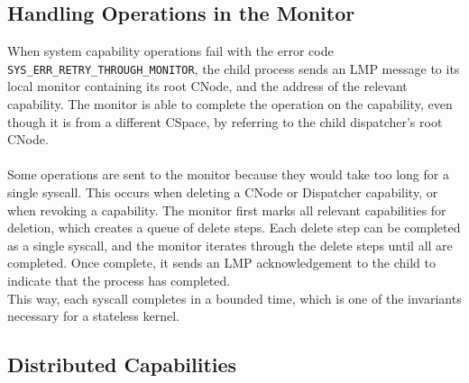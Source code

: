 \subsection{Handling Operations in the Monitor}
\noindent
When system capability operations fail with the error code \texttt{SYS\_ERR\_RETRY\_THROUGH\_MONITOR}, the child process sends an LMP message to its local monitor containing its root CNode, and the address of the relevant capability. The monitor is able to complete the operation on the capability, even though it is from a different CSpace, by referring to the child dispatcher's root CNode.
\\\\
Some operations are sent to the monitor because they would take too long for a single syscall. This occurs when deleting a CNode or Dispatcher capability, or when revoking a capability. The monitor first marks all relevant capabilities for deletion, which creates a queue of delete steps. Each delete step can be completed as a single syscall, and the monitor iterates through the delete steps until all are completed. Once complete, it sends an LMP acknowledgement to the child to indicate that the process has completed. \\
This way, each syscall completes in a bounded time, which is one of the invariants necessary for a stateless kernel.

\subsection{Distributed Capabilities}

